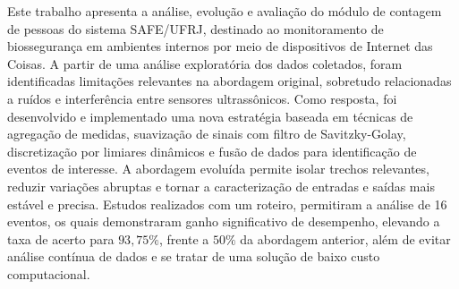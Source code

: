 Este trabalho apresenta a análise, evolução e avaliação do módulo de contagem de pessoas do sistema SAFE/UFRJ, destinado ao monitoramento de biossegurança em ambientes internos por meio de dispositivos de Internet das Coisas. A partir de uma análise exploratória dos dados coletados, foram identificadas limitações relevantes na abordagem original, sobretudo relacionadas a ruídos e interferência entre sensores ultrassônicos. Como resposta, foi desenvolvido e implementado uma nova estratégia baseada em técnicas de agregação de medidas, suavização de sinais com filtro de Savitzky-Golay, discretização por limiares dinâmicos e fusão de dados para identificação de eventos de interesse. A abordagem evoluída permite isolar trechos relevantes, reduzir variações abruptas e tornar a caracterização de entradas e saídas mais estável e precisa. Estudos realizados com um roteiro, permitiram a análise de 16 eventos, os quais demonstraram ganho significativo de desempenho, elevando a taxa de acerto para $93,75\%$, frente a $50\%$ da abordagem anterior, além de evitar análise contínua de dados e se tratar de uma solução de baixo custo computacional.
